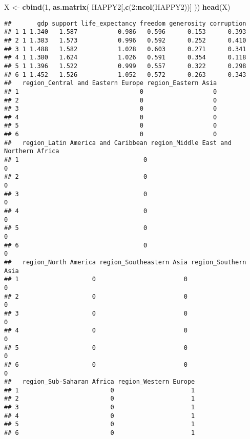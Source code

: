 \documentclass[
]{article}
\newenvironment{Shaded}{\begin{snugshade}}{\end{snugshade}}
\newcommand{\DecValTok}[1]{\textcolor[rgb]{0.00,0.00,0.81}{#1}}
\newcommand{\FunctionTok}[1]{\textcolor[rgb]{0.13,0.29,0.53}{\textbf{#1}}}
\newcommand{\NormalTok}[1]{#1}
\newcommand{\OtherTok}[1]{\textcolor[rgb]{0.56,0.35,0.01}{#1}}
\newcommand{\SpecialCharTok}[1]{\textcolor[rgb]{0.81,0.36,0.00}{\textbf{#1}}}
\begin{document}
\begin{Shaded}
\begin{Highlighting}[]
\NormalTok{X }\OtherTok{\textless{}{-}} \FunctionTok{cbind}\NormalTok{(}\DecValTok{1}\NormalTok{, }\FunctionTok{as.matrix}\NormalTok{( HAPPY2[,}\FunctionTok{c}\NormalTok{(}\DecValTok{2}\SpecialCharTok{:}\FunctionTok{ncol}\NormalTok{(HAPPY2))] ))}
\FunctionTok{head}\NormalTok{(X)}
\end{Highlighting}
\end{Shaded}

\begin{verbatim}
##       gdp support life_expectancy freedom generosity corruption
## 1 1 1.340   1.587           0.986   0.596      0.153      0.393
## 2 1 1.383   1.573           0.996   0.592      0.252      0.410
## 3 1 1.488   1.582           1.028   0.603      0.271      0.341
## 4 1 1.380   1.624           1.026   0.591      0.354      0.118
## 5 1 1.396   1.522           0.999   0.557      0.322      0.298
## 6 1 1.452   1.526           1.052   0.572      0.263      0.343
##   region_Central and Eastern Europe region_Eastern Asia
## 1                                 0                   0
## 2                                 0                   0
## 3                                 0                   0
## 4                                 0                   0
## 5                                 0                   0
## 6                                 0                   0
##   region_Latin America and Caribbean region_Middle East and Northern Africa
## 1                                  0                                      0
## 2                                  0                                      0
## 3                                  0                                      0
## 4                                  0                                      0
## 5                                  0                                      0
## 6                                  0                                      0
##   region_North America region_Southeastern Asia region_Southern Asia
## 1                    0                        0                    0
## 2                    0                        0                    0
## 3                    0                        0                    0
## 4                    0                        0                    0
## 5                    0                        0                    0
## 6                    0                        0                    0
##   region_Sub-Saharan Africa region_Western Europe
## 1                         0                     1
## 2                         0                     1
## 3                         0                     1
## 4                         0                     1
## 5                         0                     1
## 6                         0                     1
\end{verbatim}
\end{document}
